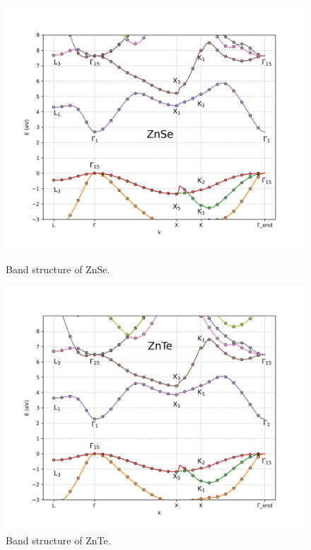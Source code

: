 \documentclass[twocolumn]{article}[h]
\begin{document}
\begin{figure}[htb]
    \centering
    \includegraphics[width=\linewidth]{ZnSe.png}
    \vspace{-1cm}
    \caption{Band structure of ZnSe.}
    \label{fig:ZnSe}

    \centering
    \includegraphics[width=\linewidth]{ZnTe.png}
    \vspace{-1cm}
    \caption{Band structure of ZnTe.}
    \label{fig:ZnTe}


\end{figure}
\end{document}
